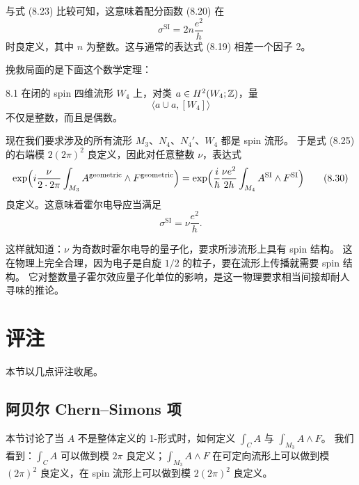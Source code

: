 与式 (8.23) 比较可知，这意味着配分函数 (8.20) 在
\begin{equation}
\sigma^{\text{SI}}=2n\frac{e^2}{h}
\tag{8.29}
\end{equation}
时良定义，其中 $n$ 为整数。这与通常的表达式 (8.19) 相差一个因子 2。

挽救局面的是下面这个数学定理：

\begin{theorem}{8.1}
在闭的 spin 四维流形 $W_4$ 上，对类 $a\in H^2(W_4;\mathbb{Z})$，量
\begin{equation*}
\langle a\cup a,[W_4]\rangle
\end{equation*}
不仅是整数，而且是偶数。
\end{theorem}

现在我们要求涉及的所有流形 $M_3$、$N_4$、$N_4'$、$W_4$ 都是 spin 流形。
于是式 (8.25) 的右端模 $2(2\pi)^2$ 良定义，因此对任意整数 $\nu$，表达式
\begin{equation}
\exp\Bigl(i\frac{\nu}{2\cdot2\pi}\int_{M_3}A^{\text{geometric}}\wedge F^{\text{geometric}}\Bigr)
=\exp\Bigl(\frac{i}{\hbar}\frac{\nu e^2}{2h}\int_{M_4}A^{\text{SI}}\wedge F^{\text{SI}}\Bigr)
\tag{8.30}
\end{equation}
良定义。这意味着霍尔电导应当满足
\begin{equation}
\sigma^{\text{SI}}=\nu\frac{e^2}{h}.
\tag{8.31}
\end{equation}

这样就知道：$\nu$ 为奇数时霍尔电导的量子化，要求所涉流形上具有 spin 结构。
这在物理上完全合理，因为电子是自旋 $1/2$ 的粒子，要在流形上传播就需要 spin 结构。
它对整数量子霍尔效应量子化单位的影响，是这一物理要求相当间接却耐人寻味的推论。


\section{评注}

本节以几点评注收尾。

\subsection{阿贝尔 Chern--Simons 项}

本节讨论了当 $A$ 不是整体定义的 1-形式时，如何定义 $\int_CA$ 与 $\int_{M_3}A\wedge F$。
我们看到：$\int_CA$ 可以做到模 $2\pi$ 良定义；$\int_{M_3}A\wedge F$
在可定向流形上可以做到模 $(2\pi)^2$ 良定义，在 spin 流形上可以做到模 $2(2\pi)^2$ 良定义。

